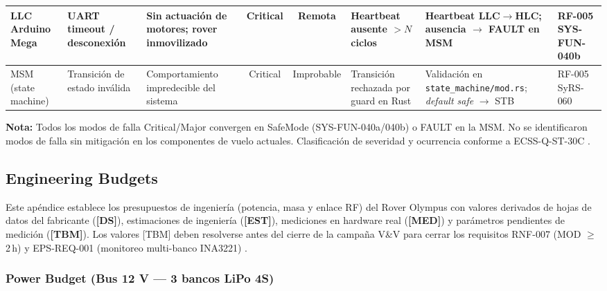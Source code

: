 \begin{landscape}
\begin{longtable}{| l | p{2.4cm} | p{2.8cm} | c | c | p{2.6cm} | p{3.8cm} | l |}
LLC Arduino Mega &
UART timeout / desconexión &
Sin actuación de motores; rover inmovilizado &
Critical & Remota &
Heartbeat ausente $>N$ ciclos &
Heartbeat LLC$\rightarrow$HLC; ausencia $\rightarrow$ FAULT en MSM &
RF-005 \newline SYS-FUN-040b \\ \hline

MSM \newline (state machine) &
Transición de estado inválida &
Comportamiento impredecible del sistema &
Critical & Improbable &
Transición rechazada por guard en Rust &
Validación en \texttt{state\_machine/mod.rs}; \textit{default safe} $\rightarrow$ STB &
RF-005 \newline SyRS-060 \\ \hline

\end{longtable}
\end{landscape}

\textbf{Nota:} Todos los modos de falla Critical/Major convergen en SafeMode (SYS-FUN-040a/040b) o FAULT en la MSM. No se identificaron modos de falla sin mitigación en los componentes de vuelo actuales. Clasificación de severidad y ocurrencia conforme a ECSS-Q-ST-30C \cite{ecss_q_st_30}.

\subsection{Engineering Budgets}\label{subsec:eng_budgets}

Este apéndice establece los presupuestos de ingeniería (potencia, masa y enlace RF) del Rover Olympus con valores derivados de hojas de datos del fabricante (\textbf{[DS]}), estimaciones de ingeniería (\textbf{[EST]}), mediciones en hardware real (\textbf{[MED]}) y parámetros pendientes de medición (\textbf{[TBM]}). Los valores [TBM] deben resolverse antes del cierre de la campaña V\&V para cerrar los requisitos RNF-007 (MOD $\ge$2\,h) y EPS-REQ-001 (monitoreo multi-banco INA3221) \cite{rpi5_brief, arduino_mega_ds}.

\subsubsection{Power Budget (Bus 12 V — 3 bancos LiPo 4S)}

